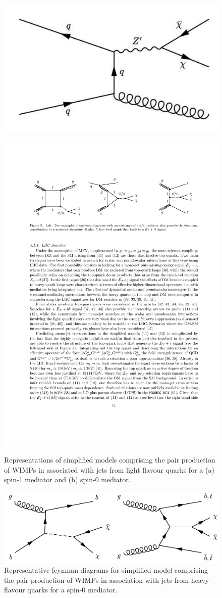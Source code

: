 
\begin{figure}[thb]
\centering
\includegraphics[width=0.35\linewidth]{vector.pdf}\,\,
\includegraphics[width=0.35\linewidth]{scalar.pdf}
\caption{Representations of simplified models comprising the pair
  production of WIMPs in associated with jets from light flavour quarks for a (a) spin-1 mediator and (b) spin-0 mediator.}
\label{fig:feyn}
\end{figure}

\begin{figure}[thb]
\centering
\includegraphics[width=0.65\linewidth]{feyn_heavy.pdf}
\caption{Representative feynman diagrams for simplified model comprising the pair production of WIMPs in association with jets from heavy flavour quarks for a spin-0 mediator.}
\label{fig:feyn1}
\end{figure}


